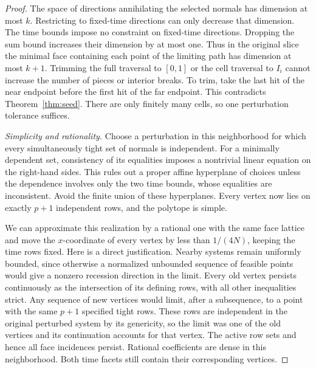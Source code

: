 \begin{proof}
The space of directions annihilating the selected normals has dimension
at most \(k\). Restricting to fixed-time directions can only decrease
that dimension. The time bounds impose no constraint on fixed-time directions. Dropping the sum bound increases their dimension by at most one. Thus in the original slice the minimal face containing each point of the limiting path has dimension at most \(k+1\). Trimming the full traversal to \([0,1]\) or the cell traversal to \(I_i\) cannot increase the number of pieces or interior breaks. To trim, take the last hit of the near endpoint before the first hit of the far endpoint. This contradicts Theorem~\ref{thm:seed}. There are only finitely many cells, so one perturbation tolerance suffices.

\emph{Simplicity and rationality.}
Choose a perturbation in this neighborhood for which every simultaneously tight set of normals is independent. For a minimally dependent set, consistency of its equalities imposes a nontrivial linear equation on the right-hand sides. This rules out a proper affine hyperplane of choices unless the dependence involves only the two time bounds, whose equalities are inconsistent. Avoid the finite union of these hyperplanes. Every vertex now lies on exactly \(p+1\) independent rows, and the polytope is simple.

We can approximate this realization by a rational one with the same face lattice and move the \(x\)-coordinate of every vertex by less than \(1/(4N)\), keeping the time rows fixed. Here is a direct justification. Nearby systems remain uniformly bounded, since otherwise a normalized unbounded sequence of feasible points would give a nonzero recession direction in the limit. Every old vertex persists continuously as the intersection of its defining rows, with all other inequalities strict. Any sequence of new vertices would limit, after a subsequence, to a point with the same \(p+1\) specified tight rows. These rows are independent in the original perturbed system by its genericity, so the limit was one of the old vertices and its continuation accounts for that vertex. The active row sets and hence all face incidences persist. Rational coefficients are dense in this neighborhood. Both time facets still contain their corresponding vertices.


\end{proof}
